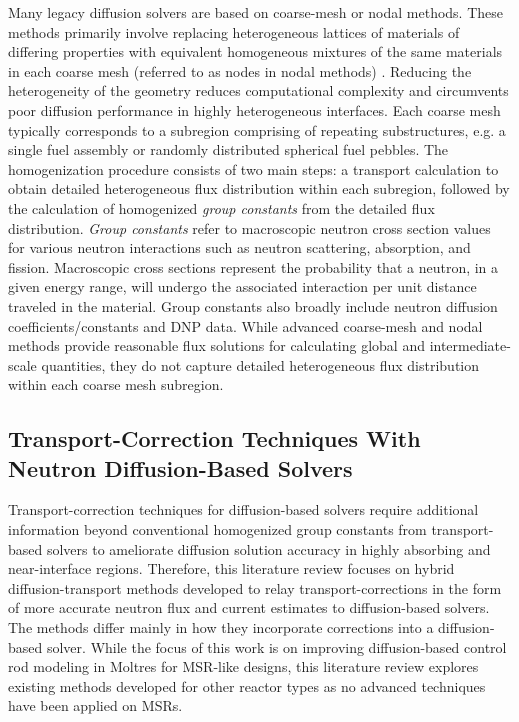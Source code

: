 Many legacy diffusion solvers are based on coarse-mesh or nodal methods. These methods
primarily involve replacing heterogeneous lattices of materials of differing properties with
equivalent homogeneous mixtures of the same materials in each coarse mesh (referred to as nodes in
nodal methods) \cite{stacey_nuclear_2007}. Reducing the heterogeneity of the geometry reduces
computational complexity and circumvents poor diffusion performance in highly heterogeneous
interfaces. Each coarse mesh typically corresponds to a subregion comprising of repeating
substructures, e.g. a single fuel assembly or randomly distributed spherical fuel pebbles. The
homogenization procedure consists of two main steps: a transport calculation to obtain detailed
heterogeneous flux distribution within each subregion, followed by the calculation of homogenized
\textit{group constants} from the detailed flux distribution. \textit{Group constants} refer to
macroscopic neutron cross section values for various neutron interactions such as neutron
scattering, absorption, and fission. Macroscopic cross sections represent the probability that a
neutron, in a given energy range, will undergo the associated interaction per unit distance
traveled in the material. Group constants also broadly include neutron diffusion
coefficients/constants and \gls{DNP} data. While advanced coarse-mesh and nodal
methods provide reasonable flux solutions for calculating global and intermediate-scale quantities,
they do not capture detailed heterogeneous flux distribution within each coarse mesh subregion.

\subsection{Transport-Correction Techniques With Neutron Diffusion-Based Solvers}

Transport-correction techniques for diffusion-based solvers require additional information beyond
conventional homogenized group constants from transport-based solvers to ameliorate diffusion
solution accuracy in highly absorbing and near-interface regions.
Therefore, this literature review focuses on hybrid diffusion-transport methods developed to relay
transport-corrections in the form of more accurate neutron flux and current estimates to
diffusion-based solvers. The methods differ mainly in how they incorporate corrections into a
diffusion-based solver. While the focus of this work is on improving diffusion-based control rod
modeling in Moltres for \gls{MSR}-like designs, this literature review explores existing methods
developed for other reactor types as no advanced techniques have been applied on \glspl{MSR}.

